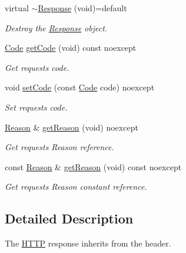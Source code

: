 \begin{DoxyCompactItemize}
\item 
virtual \mbox{\hyperlink{classo_z_1_1_h_t_t_p_1_1_response_a0dd4953fa89d6f7c8fbe6fdc6a9ca50e}{$\sim$\+Response}} (void)=default
\begin{DoxyCompactList}\small\item\em Destroy the \mbox{\hyperlink{classo_z_1_1_h_t_t_p_1_1_response}{Response}} object. \end{DoxyCompactList}\item 
\mbox{\hyperlink{namespaceo_z_1_1_h_t_t_p_acd43703151305f79b1e2f42e98ee8199}{Code}} \mbox{\hyperlink{classo_z_1_1_h_t_t_p_1_1_response_aa2191a167fe53e8f0a8c2e64393cede0}{get\+Code}} (void) const noexcept
\begin{DoxyCompactList}\small\item\em Get request\textquotesingle{}s code. \end{DoxyCompactList}\item 
void \mbox{\hyperlink{classo_z_1_1_h_t_t_p_1_1_response_a37a97a943ebded8fca87ee14cd76c0fa}{set\+Code}} (const \mbox{\hyperlink{namespaceo_z_1_1_h_t_t_p_acd43703151305f79b1e2f42e98ee8199}{Code}} code) noexcept
\begin{DoxyCompactList}\small\item\em Set request\textquotesingle{}s code. \end{DoxyCompactList}\item 
\mbox{\hyperlink{namespaceo_z_1_1_h_t_t_p_afcd8b91e5e8a7b6df0a7b3b298ec3965}{Reason}} \& \mbox{\hyperlink{classo_z_1_1_h_t_t_p_1_1_response_a72ccc6e4aa64f1bf2c54218436631a26}{get\+Reason}} (void) noexcept
\begin{DoxyCompactList}\small\item\em Get request\textquotesingle{}s Reason reference. \end{DoxyCompactList}\item 
const \mbox{\hyperlink{namespaceo_z_1_1_h_t_t_p_afcd8b91e5e8a7b6df0a7b3b298ec3965}{Reason}} \& \mbox{\hyperlink{classo_z_1_1_h_t_t_p_1_1_response_a9b05303e7b76a04d3ab4ed8960de130c}{get\+Reason}} (void) const noexcept
\begin{DoxyCompactList}\small\item\em Get request\textquotesingle{}s Reason constant reference. \end{DoxyCompactList}\end{DoxyCompactItemize}


\subsection{Detailed Description}
The \mbox{\hyperlink{namespaceo_z_1_1_h_t_t_p}{H\+T\+TP}} response inherits from the header. 

